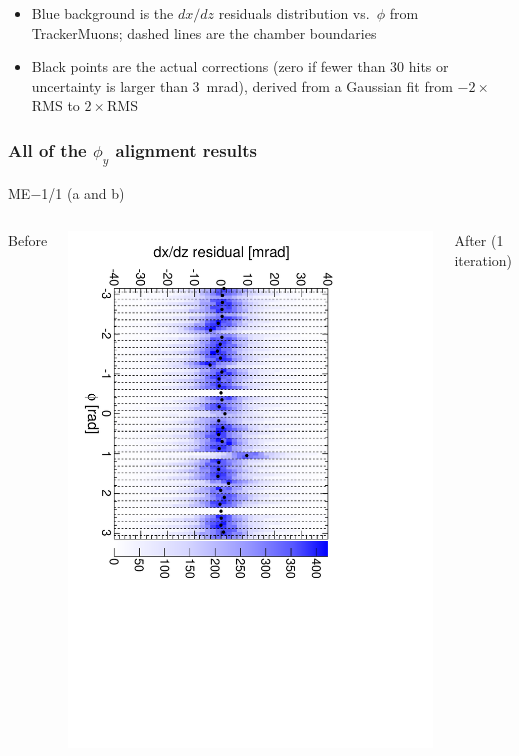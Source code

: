 \documentclass[compress]{beamer}
\begin{document}
\begin{frame}
\begin{itemize}
\item Blue background is the $dx/dz$ residuals distribution
  vs.\ $\phi$ from TrackerMuons; dashed lines are the chamber boundaries
\item Black points are the actual corrections (zero if fewer than 30
  hits or uncertainty is larger than 3~mrad), derived from a Gaussian
  fit from $-2\times$RMS to $2\times$RMS
\end{itemize}
\end{frame}

\begin{frame}
\frametitle{All of the $\phi_y$ alignment results}
\begin{center}
ME$-$1/1 (a and b)
\end{center}

\begin{columns}
\centering Before

\includegraphics[height=\linewidth, angle=90]{iter01_mem11.pdf}

\centering After (1 iteration)


\end{columns}
\end{frame}
\end{document}
